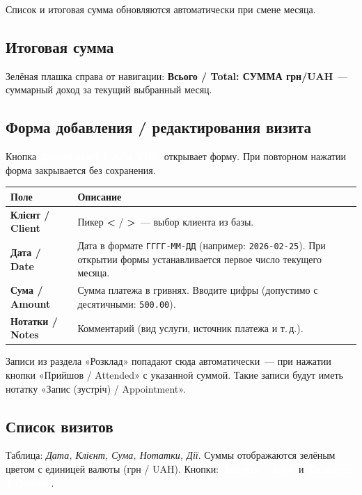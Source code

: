 \documentclass[12pt,a4paper]{article}
\newcommand{\btn}[2][primary]{%
  \textcolor{white}{\colorbox{#1}{\small\bfseries\,#2\,}}%
}
\newcommand{\btnred}[1]{\btn[danger]{#1}}
\begin{document}
Список и итоговая сумма обновляются автоматически при смене месяца.

\subsection{Итоговая сумма}

Зелёная плашка справа от навигации:
\textbf{Всього / Total: СУММА грн/UAH}~---
суммарный доход за текущий выбранный месяц.

\subsection{Форма добавления / редактирования визита}

Кнопка \btn{Додати візит / Add Visit} открывает форму.
При повторном нажатии форма закрывается без сохранения.

\bigskip
\begin{center}
\begin{tabularx}{0.9\textwidth}{>{\bfseries}lX}
  \toprule
  Поле & Описание \\
  \midrule
  Клієнт / Client &
    Пикер \textbf{<} / \textbf{>}~--- выбор клиента из базы. \\
  Дата / Date &
    Дата в формате \texttt{ГГГГ-ММ-ДД} (например: \texttt{2026-02-25}).
    При открытии формы устанавливается первое число текущего месяца. \\
  Сума / Amount &
    Сумма платежа в гривнях. Вводите цифры (допустимо с десятичными:
    \texttt{500.00}). \\
  Нотатки / Notes &
    Комментарий (вид услуги, источник платежа и т.\,д.). \\
  \bottomrule
\end{tabularx}
\end{center}

\begin{notebox}
  Записи из раздела «Розклад» попадают сюда автоматически~---
  при нажатии кнопки «Прийшов / Attended» с указанной суммой.
  Такие записи будут иметь нотатку «Запис (зустріч) / Appointment».
\end{notebox}

\subsection{Список визитов}

Таблица: \textit{Дата, Клієнт, Сума, Нотатки, Дії}.
Суммы отображаются зелёным цветом с единицей валюты (грн / UAH).
Кнопки: \btn{Змінити / Edit} и \btnred{Видалити / Delete}.
\end{document}
